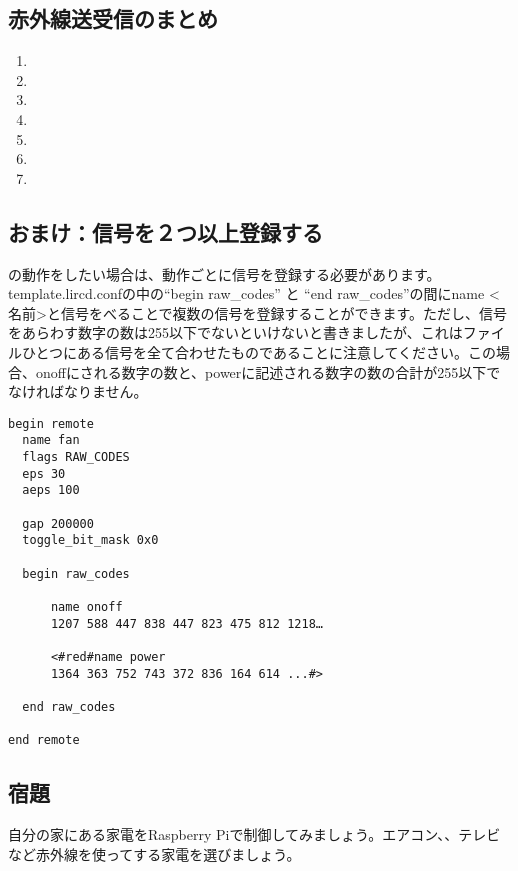 \subsection{赤外線送受信のまとめ}
\begin{enumerate}
\item {}
\item {}
\item {}
\item {}
\item {}
\item {}
\item {}
\end{enumerate}

\subsection{おまけ：信号を２つ以上登録する}
の動作をしたい場合は、動作ごとに信号を登録する必要があります。template.lircd.confの中の“begin raw\_codes” と “end raw\_codes”の間にname <名前>と信号をべることで複数の信号を登録することができます。ただし、信号をあらわす数字の数は255以下でないといけないと書きましたが、これはファイルひとつにある信号を全て合わせたものであることに注意してください。この場合、onoffにされる数字の数と、powerに記述される数字の数の合計が255以下でなければなりません。\\

\begin{lstlisting}[caption=２つの信号を登録するときのtemplate.lircd.comf,label=２つの信号を登録するときのtemplate.lircd.comf]
begin remote
  name fan
  flags RAW_CODES
  eps 30
  aeps 100

  gap 200000
  toggle_bit_mask 0x0

  begin raw_codes

      name onoff
      1207 588 447 838 447 823 475 812 1218…

      <#red#name power
      1364 363 752 743 372 836 164 614 ...#>

  end raw_codes

end remote
\end{lstlisting}

\subsection{宿題}
自分の家にある家電をRaspberry Piで制御してみましょう。エアコン、、テレビなど赤外線を使ってする家電を選びましょう。